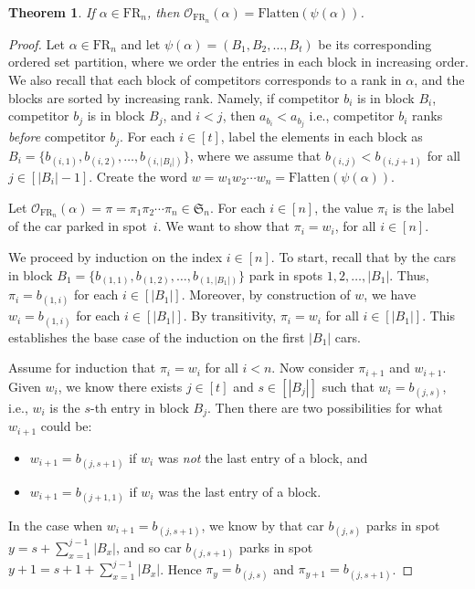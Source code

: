 \documentclass[10pt,a4paper]{amsart}
\newtheorem{theorem}{Theorem}
\newcommand{\FR}[1]{\mathrm{FR}_{#1}}
\newcommand{\Flatten}[0]{\mathrm{Flatten}}
\newcommand{\Sym}{\mathfrak{S}}
\newcommand{\out}{\mathcal{O}}
\begin{document}
\begin{theorem}\label{thm:ordered set partition is the outcome}
    If $\alpha\in\FR{n}$, then 
    $\out_{\FR{n}}(\alpha)=\Flatten(\psi(\alpha))$.
\end{theorem}

\begin{proof}
    Let $\alpha\in\FR{n}$ and let $\psi(\alpha)=(B_1,B_2,\ldots,B_t)$ be its corresponding ordered set partition, where we order the entries in each block in increasing order. 
    We also recall that each block of competitors corresponds to a rank in $\alpha$, and the blocks are sorted by increasing rank. Namely, if competitor $b_i$ is in block $B_i$, competitor $b_j$ is in block $B_j$, and $i < j$, then $a_{b_i} < a_{b_j}$ i.e., competitor $b_i$ ranks \textit{before} competitor $b_j$. 
    For each $i\in[t]$, label the elements in each block as $B_i=\{b_{(i,1)},b_{(i,2)},\ldots,b_{(i,|B_i|)}\}$, where we assume that $b_{(i,j)}<b_{(i,j+1)}$ for all $j\in[|B_i|-1]$. 
    Create the word $w=w_1w_2\cdots w_n=\Flatten(\psi(\alpha))$.
    
    
    Let
    $\out_{\FR{n}}(\alpha)=\pi=\pi_1\pi_2\cdots\pi_n\in\Sym_n$. 
    For each $i\in [n]$, the value $\pi_i$ is the label of the car parked in spot~$i$.
    We want to show that 
    $\pi_i=w_i$, for all $i\in[n]$.
    
    
    We proceed by induction on the index $i\in[n]$. 
    To start, recall that by  
    the cars in block 
    $B_1=\{b_{(1,1)},b_{(1,2)},\ldots,b_{(1,|B_1|)}\}$ park in spots $1,2,\ldots,|B_1|$.
    Thus, $\pi_i=b_{(1,i)}$ for each $i\in[|B_1|]$. 
    Moreover, by construction of $w$, we have $w_i=b_{(1,i)}$ for each $i\in[|B_1|]$. By transitivity, $\pi_i=w_i$ for all $i\in[|B_1|]$.
    This establishes the base case of the induction on the first $|B_1|$ cars.
    
    Assume for induction that $\pi_i=w_i$ for all $i< n$.
    Now consider $\pi_{i+1}$ and $w_{i+1}$.
    Given $w_i$, we know there exists $j\in[t]$ and $s\in[|B_j|]$ such that 
    $w_{i}=b_{(j,s)}$, i.e., $w_i$ is the $s$-th entry in block $B_j$. 
    Then there are two possibilities for what $w_{i+1}$ could be:
    \begin{itemize}
        \item $w_{i+1}=b_{(j,s+1)}$ if $w_i$ was \textit{not} the last entry of a block, and 
        \item $w_{i+1}=b_{(j+1,1)}$ if $w_i$ was the last entry of a block.
    \end{itemize}
    In the case when $w_{i+1}=b_{(j,s+1)}$, we know by  that car $b_{(j,s)}$ parks in spot 
    $y=s+\sum_{x=1}^{j-1}|B_x|$,
    and so car $b_{(j,s+1)}$ parks in spot 
    $y+1=s+1+\sum_{x=1}^{j-1}|B_x|$.
    Hence $\pi_y=b_{(j,s)}$ and $\pi_{y+1}=b_{(j,s+1)}$.
    

\end{proof}
\end{document}
